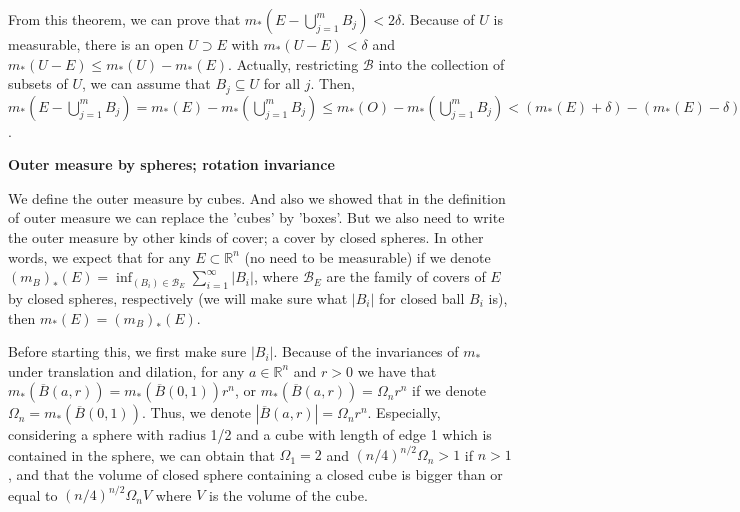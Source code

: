 \documentclass{article}
\newcommand{\ReR}{\mathbb{R}}
\begin{document}
From this theorem, we can prove that \textit{$m_*(E - \bigcup_{j = 1}^m B_j) < 2\delta$}.
Because of $U$ is measurable, there is an open $U \supset E$ with $m_*(U - E) < \delta$ and $m_*(U - E) \le m_*(U) - m_*(E)$.
Actually, restricting $\mathcal{B}$ into the collection of subsets of $U$, we can assume that $B_j \subseteq U$ for all $j$.
Then, $m_*(E - \bigcup_{j = 1}^m B_j) = m_*(E) - m_*(\bigcup_{j = 1}^m B_j) \le m_*(O) - m_*(\bigcup_{j = 1}^m B_j) < (m_*(E) + \delta) - (m_*(E) - \delta) = 2\delta$.

\newpage

\textbf{Outer measure by spheres; rotation invariance}

We define the outer measure by cubes.
And also we showed that in the definition of outer measure we can replace the 'cubes' by 'boxes'.
But we also need to write the outer measure by other kinds of cover; a cover by closed spheres.
In other words, we expect that for any $E \subset \ReR^n$ (no need to be measurable) if we denote $(m_B)_*(E) = \inf_{(B_i) \in \mathcal{B}_E} \sum_{i = 1}^\infty |B_i|$, where $\mathcal{B}_E$ are the family of covers of $E$ by closed spheres, respectively (we will make sure what $|B_i|$ for closed ball $B_i$ is), then $m_*(E) = (m_B)_*(E)$.

Before starting this, we first make sure $|B_i|$.
Because of the invariances of $m_*$ under translation and dilation, for any $a \in \ReR^n$ and $r > 0$ we have that $m_*(\overline{B}(a, r)) = m_*(\overline{B}(0, 1)) r^n$, or $m_*(\overline{B}(a, r)) = \Omega_n r^n$ if we denote $\Omega_n = m_*(\overline{B}(0, 1))$.
Thus, we denote $|\overline{B}(a, r)| = \Omega_n r^n$.
Especially, considering a sphere with radius 1/2 and a cube with length of edge 1 which is contained in the sphere, we can obtain that $\Omega_1 = 2$ and $(n/4)^{n/2} \Omega_n > 1$ if $n > 1$, and that the volume of closed sphere containing a closed cube is bigger than or equal to $(n/4)^{n/2} \Omega_n V$ where $V$ is the volume of the cube.
\end{document}
